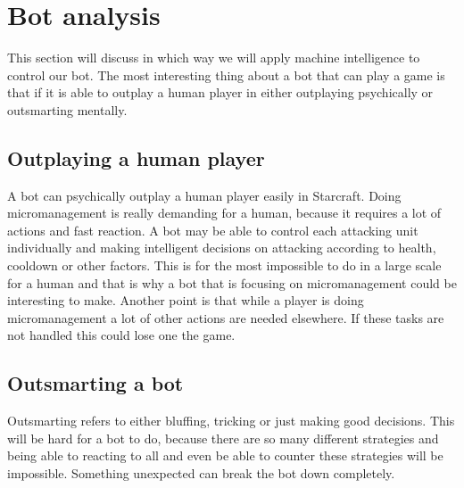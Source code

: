 \section{Bot analysis}
	This section will discuss in which way we will apply machine intelligence to control our bot. The most interesting thing about a bot that can play a game is that if it is able to outplay a 
	human player in either outplaying psychically or outsmarting mentally. 
	
	\subsection*{Outplaying a human player}
		A bot can psychically outplay a human player easily in Starcraft. 
		Doing micromanagement is really demanding for a human, because it requires a lot of actions and fast reaction. A bot may be able to control each 
		attacking unit individually and making intelligent decisions on attacking according to health, cooldown or other factors. This is for the most 
		impossible to do in a large scale for a human and that is why a bot that is focusing on micromanagement could be interesting to make. Another point 
		is that while a player is doing micromanagement a lot of other actions are needed elsewhere. If these tasks are not handled this could lose one the game.
		
	\subsection*{Outsmarting a bot}
		Outsmarting refers to either bluffing, tricking or just making good decisions. This will be hard for a bot to do, because there are so many 
		different strategies and being able to reacting to all and even be able to counter these strategies will be impossible. Something unexpected 
		can break the bot down completely.
		
	
